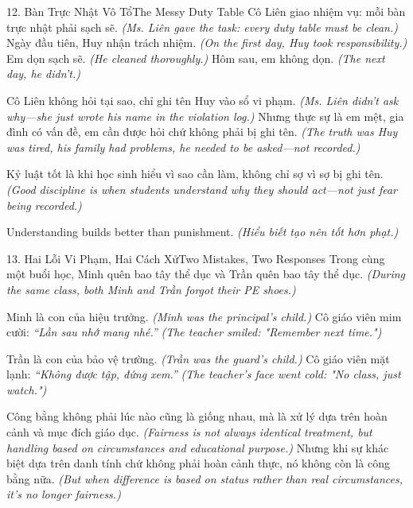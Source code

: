 \begin{truyen}{12. Bàn Trực Nhật Vô Tổ}{The Messy Duty Table}
Cô Liên giao nhiệm vụ: mỗi bàn trực nhật phải sạch sẽ.
\textit{(Ms. Liên gave the task: every duty table must be clean.)}
Ngày đầu tiên, Huy nhận trách nhiệm.
\textit{(On the first day, Huy took responsibility.)}
Em dọn sạch sẽ.
\textit{(He cleaned thoroughly.)}
Hôm sau, em không dọn.
\textit{(The next day, he didn't.)}

Cô Liên không hỏi tại sao, chỉ ghi tên Huy vào sổ vi phạm.
\textit{(Ms. Liên didn't ask why—she just wrote his name in the violation log.)}
Nhưng thực sự là em mệt, gia đình có vấn đề, em cần được hỏi chứ không phải bị ghi tên.
\textit{(The truth was Huy was tired, his family had problems, he needed to be asked—not recorded.)}

Kỷ luật tốt là khi học sinh hiểu vì sao cần làm, không chỉ sợ vì sợ bị ghi tên.
\textit{(Good discipline is when students understand why they should act—not just fear being recorded.)}
\end{truyen}

\begin{baihoc}
Understanding builds better than punishment.
\textit{(Hiểu biết tạo nên tốt hơn phạt.)}
\end{baihoc}

\begin{truyen}{13. Hai Lỗi Vi Phạm, Hai Cách Xử}{Two Mistakes, Two Responses}
Trong cùng một buổi học, Minh quên bao tây thể dục và Trần quên bao tây thể dục.
\textit{(During the same class, both Minh and Trần forgot their PE shoes.)}

Minh là con của hiệu trưởng.
\textit{(Minh was the principal's child.)}
Cô giáo viên mim cười: \textit{``Lần sau nhớ mang nhé.''}
\textit{(The teacher smiled: "Remember next time.")}

Trần là con của bảo vệ trường.
\textit{(Trần was the guard's child.)}
Cô giáo viên mặt lạnh: \textit{``Không được tập, đứng xem.''}
\textit{(The teacher's face went cold: "No class, just watch.")}

Công bằng không phải lúc nào cũng là giống nhau, mà là xử lý dựa trên hoàn cảnh và mục đích giáo dục.
\textit{(Fairness is not always identical treatment, but handling based on circumstances and educational purpose.)}
Nhưng khi sự khác biệt dựa trên danh tính chứ không phải hoàn cảnh thực, nó không còn là công bằng nữa.
\textit{(But when difference is based on status rather than real circumstances, it's no longer fairness.)}
\end{truyen}

